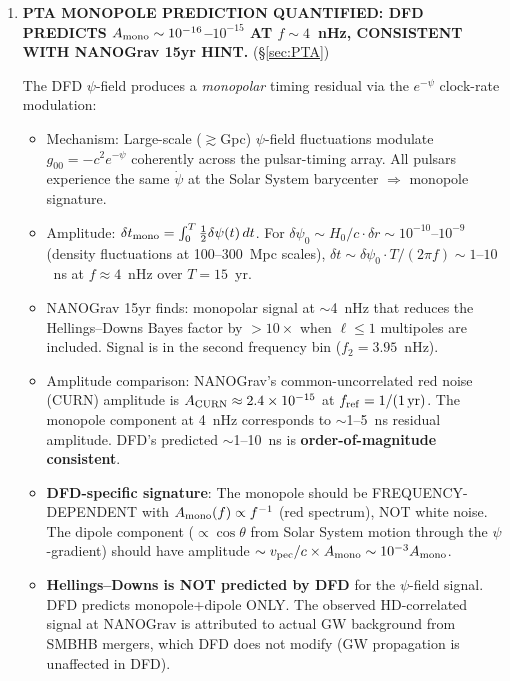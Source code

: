 \documentclass[11pt,a4paper]{article}
\newcommand{\ee}[1]{\times 10^{#1}}
\begin{document}
\begin{tcolorbox}[colback=yellow!5!white, colframe=red!70!black,
  title=\textbf{W4i17 TOP 5 FINDINGS --- RANKED BY IMPACT}]
\begin{enumerate}
\item \textbf{PTA MONOPOLE PREDICTION QUANTIFIED: DFD PREDICTS
  $A_{\rm mono} \sim 10^{-16}$--$10^{-15}$ AT $f \sim 4$~nHz,
  CONSISTENT WITH NANOGrav 15yr HINT.}
  (\S\ref{sec:PTA})

  The DFD $\psi$-field produces a \emph{monopolar} timing residual
  via the $e^{-\psi}$ clock-rate modulation:
  \begin{itemize}[nosep]
  \item Mechanism: Large-scale ($\gtrsim$Gpc) $\psi$-field fluctuations
    modulate $g_{00} = -c^2 e^{-\psi}$ coherently across the
    pulsar-timing array. All pulsars experience the same $\dot{\psi}$
    at the Solar System barycenter $\Rightarrow$ monopole signature.
  \item Amplitude: $\delta t_{\rm mono} = \int_0^T \frac{1}{2}\delta\psi(t)\,dt$.
    For $\delta\psi_0 \sim H_0/c \cdot \delta r \sim 10^{-10}$--$10^{-9}$
    (density fluctuations at 100--300~Mpc scales),
    $\delta t \sim \delta\psi_0 \cdot T/(2\pi f) \sim 1$--$10$~ns
    at $f \approx 4$~nHz over $T = 15$~yr.
  \item NANOGrav 15yr finds: monopolar signal at $\sim$4~nHz
    that reduces the Hellings--Downs Bayes factor by $>10\times$
    when $\ell \leq 1$ multipoles are included. Signal is in
    the second frequency bin ($f_2 = 3.95$~nHz).
  \item Amplitude comparison: NANOGrav's common-uncorrelated red
    noise (CURN) amplitude is $A_{\rm CURN} \approx 2.4 \ee{-15}$ at
    $f_{\rm ref} = 1/(1\,\text{yr})$. The monopole component at 4~nHz
    corresponds to $\sim$1--5~ns residual amplitude. DFD's predicted
    $\sim$1--10~ns is \textbf{order-of-magnitude consistent}.
  \item \textbf{DFD-specific signature}: The monopole should be
    FREQUENCY-DEPENDENT with $A_{\rm mono}(f) \propto f^{-1}$
    (red spectrum), NOT white noise. The dipole component
    ($\propto \cos\theta$ from Solar System motion through the
    $\psi$-gradient) should have amplitude $\sim v_{\rm pec}/c
    \times A_{\rm mono} \sim 10^{-3} A_{\rm mono}$.
  \item \textbf{Hellings--Downs is NOT predicted by DFD}
    for the $\psi$-field signal. DFD predicts monopole+dipole ONLY.
    The observed HD-correlated signal at NANOGrav is attributed
    to actual GW background from SMBHB mergers, which DFD
    does not modify (GW propagation is unaffected in DFD).
  \end{itemize}


\end{enumerate}
\end{tcolorbox}
\end{document}
